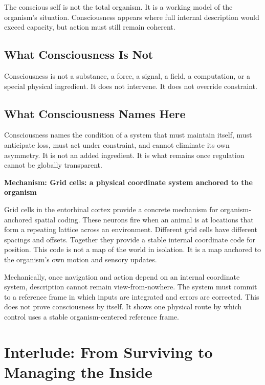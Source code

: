 \documentclass[11pt,twoside,openright]{book}
\newenvironment{mechanismbox}[1]
  {\begin{framed}\noindent\textbf{Mechanism: #1}\par\medskip}
  {\end{framed}}
\begin{document}
The conscious self is not the total organism. It is a working model of the organism's situation. Consciousness appears where full internal description would exceed capacity, but action must still remain coherent.

\section*{What Consciousness Is Not}

Consciousness is not a substance, a force, a signal, a field, a computation, or a special physical ingredient. It does not intervene. It does not override constraint.

\section*{What Consciousness Names Here}

Consciousness names the condition of a system that must maintain itself, must anticipate loss, must act under constraint, and cannot eliminate its own asymmetry. It is not an added ingredient. It is what remains once regulation cannot be globally transparent.

\begin{mechanismbox}{Grid cells: a physical coordinate system anchored to the organism}

Grid cells in the entorhinal cortex provide a concrete mechanism for organism-anchored spatial coding. These neurons fire when an animal is at locations that form a repeating lattice across an environment. Different grid cells have different spacings and offsets. Together they provide a stable internal coordinate code for position. This code is not a map of the world in isolation. It is a map anchored to the organism's own motion and sensory updates.

Mechanically, once navigation and action depend on an internal coordinate system, description cannot remain view-from-nowhere. The system must commit to a reference frame in which inputs are integrated and errors are corrected. This does not prove consciousness by itself. It shows one physical route by which control uses a stable organism-centered reference frame.

\end{mechanismbox}

\clearpage
{%
  \let\cleardoublepage\clearpage
  \chapter{Interlude: From Surviving to Managing the Inside}
}
\end{document}
